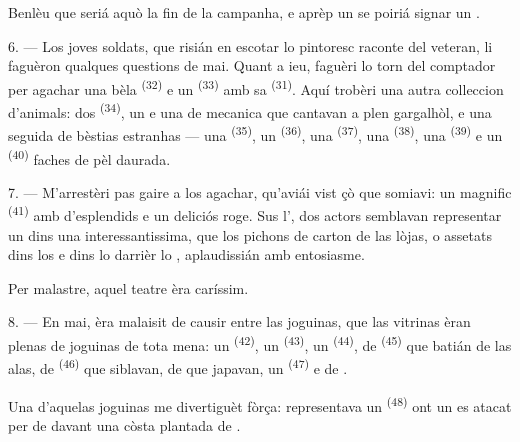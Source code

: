Benlèu que seriá aquò la fin de la campanha, e aprèp un  se
poiriá signar un .

\VUsaut{4.4mm}
\VUsaut{2.8mm}

6. --- Los joves soldats, que risián en escotar lo pintoresc raconte del veteran,
li faguèron qualques questions de mai. Quant a ieu, faguèri lo torn del comptador
per agachar una bèla  \textsuperscript{(32)} e un 
\textsuperscript{(33)} amb sa  \textsuperscript{(31)}. Aquí trobèri
una autra colleccion d'animals: dos 
\textsuperscript{(34)}, un  e una  de mecanica
que cantavan a plen gargalhòl, e una seguida de bèstias estranhas --- una
 \textsuperscript{(35)}, un 
\textsuperscript{(36)}, una  \textsuperscript{(37)}, una
 \textsuperscript{(38)}, una  \textsuperscript{(39)} e
un  \textsuperscript{(40)} faches de pèl daurada.

7. --- M'arrestèri pas gaire a los agachar, qu'aviái vist çò que somiavi: un
magnific  \textsuperscript{(41)} amb d'esplendids
 e un deliciós  roge. Sus l', dos
actors semblavan representar un  dins una 
interessantissima, que los pichons  de carton de las lòjas, o
assetats dins los  e dins lo  darrièr lo
, aplaudissián amb entosiasme.

Per malastre, aquel teatre èra caríssim.

8. --- En mai, èra malaisit de causir entre las joguinas, que las vitrinas èran
plenas de joguinas de tota mena: un  \textsuperscript{(42)}, un
 \textsuperscript{(43)}, un 
\textsuperscript{(44)}, de  \textsuperscript{(45)} que batián de
las alas, de  \textsuperscript{(46)} que siblavan, de
 que japavan, un  \textsuperscript{(47)} e de
.


Una d'aquelas joguinas me divertiguèt fòrça: representava un 
\textsuperscript{(48)} ont un  es atacat per de 
davant una còsta plantada de .

